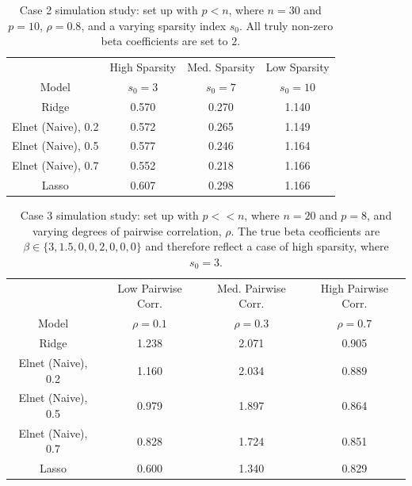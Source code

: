 \begin{table}[H]
\centering
\begin{tabular}{||c c c c||} 
\hline
& High Sparsity & Med. Sparsity & Low Sparsity \\ [0.5ex] 
Model & $s_0=3$ & $s_0=7$ & $s_0=10$ \\ [0.5ex]
\hline\hline
Ridge & 0.570 & 0.270 & \cellcolor{pink!60}1.140 \\
\hline
Elnet (Naive), 0.2 & 0.572 & 0.265 & 1.149 \\
\hline
Elnet (Naive), 0.5 & 0.577 & 0.246 & 1.164\\
\hline
Elnet (Naive), 0.7 & \cellcolor{pink!60}0.552 & \cellcolor{pink!60}0.218 & 1.166\\
\hline
Lasso & 0.607 & 0.298 & 1.166\\
\hline
\end{tabular}
\caption[Case 2 simulation study]{Case 2 simulation study: set up with $p<n$, where $n=30$ and $p=10$, $\rho = 0.8$, and a varying sparsity index $s_{0}$. All truly non-zero beta coefficients are set to $2$. }
\label{tab:case2}
\end{table}

\begin{table}[H]
\centering
\begin{tabular}{||c c c c||} 
\hline
& Low Pairwise Corr. & Med. Pairwise Corr. & High Pairwise Corr. \\ [0.5ex] 
Model & $\rho=0.1$ & $\rho=0.3$ & $\rho=0.7$\\ [0.5ex]
\hline\hline
Ridge & 1.238 & 2.071 & 0.905\\ 
\hline
Elnet (Naive), 0.2 & 1.160 & 2.034 & 0.889\\
\hline
Elnet (Naive), 0.5 & 0.979 & 1.897 & 0.864\\
\hline
Elnet (Naive), 0.7 & 0.828 & 1.724 & 0.851\\
\hline
Lasso & \cellcolor{pink!60}0.600 & \cellcolor{pink!60}1.340 & \cellcolor{pink!60}0.829\\
\hline
\end{tabular}
\caption[Case 3 simulation study]{Case 3 simulation study: set up with $p<<n$, where $n=20$ and $p=8$, and varying degrees of pairwise correlation, $\rho$. The true beta ceofficients are $\beta \in \{3, 1.5, 0, 0, 2, 0, 0, 0\}$ and therefore reflect a case of high sparsity, where $s_{0}=3$.}
\label{tab:case3}
\end{table}

